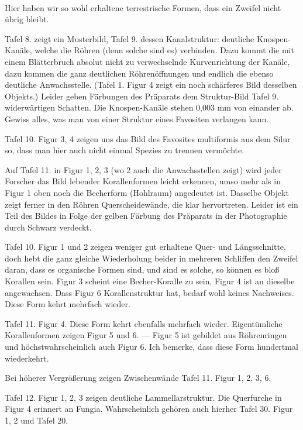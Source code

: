 \documentclass[a4paper, 12pt, oneside]{article}
\begin{document}
\paragraph{}
Hier haben wir so wohl erhaltene terrestrische Formen, dass ein Zweifel nicht übrig bleibt.

Tafel 8. zeigt ein Musterbild, Tafel 9. dessen Kanalstruktur: deutliche Knospen-Kanäle, welche die Röhren (denn solche sind es) verbinden. Dazu kommt die mit einem Blätterbruch absolut nicht zu verwechselnde Kurvenrichtung der Kanäle, dazu kommen die ganz deutlichen Röhrenöffnungen und endlich die ebenso deutliche Anwachsstelle. (Tafel 1. Figur 4 zeigt ein noch schärferes Bild desselben Objekts.) Leider geben Färbungen des Präparats dem Struktur-Bild Tafel 9. widerwärtigen Schatten. Die Knospen-Kanäle stehen 0,003 mm von einander ab. Gewiss alles, was man von einer Struktur eines Favositen verlangen kann.

Tafel 10. Figur 3, 4 zeigen uns das Bild des Favosites multiformis aus dem Silur so, dass man hier auch nicht einmal Spezies zu trennen vermöchte.

Auf Tafel 11. in Figur 1, 2, 3 (wo 2 auch die Anwachsstellen zeigt) wird jeder Forscher das Bild lebender Korallenformen leicht erkennen, umso mehr als in Figur 1 oben noch die Becherform (Hohlraum) angedeutet ist. Dasselbe Objekt zeigt ferner in den Röhren Querscheidewände, die klar hervortreten. Leider ist ein Teil des Bildes in Folge der gelben Färbung des Präparats in der Photographie durch Schwarz verdeckt.

Tafel 10. Figur 1 und 2 zeigen weniger gut erhaltene Quer- und Längsschnitte, doch hebt die ganz gleiche Wiederholung beider in mehreren Schliffen den Zweifel daran, dass es organische Formen sind, und sind es solche, so können es bloß Korallen sein. Figur 3 scheint eine Becher-Koralle zu sein, Figur 4 ist an dieselbe angewachsen. Dass Figur 6 Korallenstruktur hat, bedarf wohl keines Nachweises. Diese Form kehrt mehrfach wieder.

Tafel 11. Figur 4. Diese Form kehrt ebenfalls mehrfach wieder. Eigentümliche Korallenformen zeigen Figur 5 und 6. — Figur 5 ist gebildet aus Röhrenringen und höchstwahrscheinlich auch Figur 6. Ich bemerke, dass diese Form hundertmal wiederkehrt.

Bei höherer Vergrößerung zeigen Zwischenwände Tafel 11. Figur 1, 2, 3, 6.

Tafel 12. Figur 1, 2, 3 zeigen deutliche Lammellarstruktur. Die Querfurche in Figur 4 erinnert an Fungia. Wahrscheinlich gehören auch hierher Tafel 30. Figur 1, 2 und Tafel 20.
\end{document}
